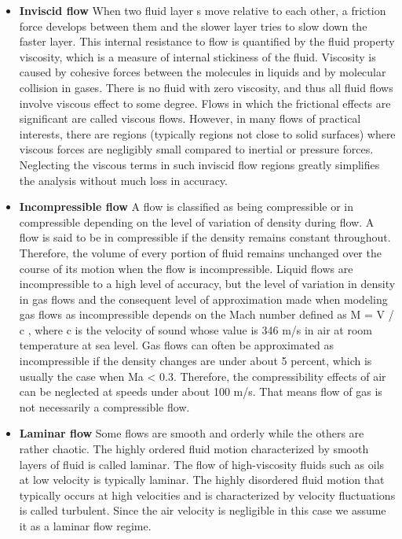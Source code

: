 \begin{itemize}
	\item  \textbf{Inviscid flow}
	When two fluid layer s move relative to each other, a friction force develops between them and the slower layer tries to slow down the faster layer. This internal resistance to flow is quantified by the fluid property viscosity, which is a measure of internal stickiness of the fluid. Viscosity is caused by cohesive forces between the molecules in liquids and by molecular collision in gases. There is no fluid with zero viscosity, and thus all fluid flows involve viscous effect to some degree. Flows in which the frictional effects are significant are called viscous flows. However, in many flows of practical interests, there are regions (typically regions not close to solid surfaces) where viscous forces are negligibly small compared to inertial or pressure forces. Neglecting the viscous terms in such inviscid flow regions greatly simplifies the analysis without much loss in accuracy.   
	
	\item \textbf{Incompressible flow}
	A flow is classified as being compressible or in compressible depending on the level of variation of density during flow. A flow is said to be in compressible if the density remains constant throughout. Therefore, the volume of every portion of fluid remains unchanged over the course of its motion when the flow is incompressible.
	Liquid flows are incompressible to a high level of accuracy, but the level of variation in density in gas flows and the consequent level of approximation made when modeling gas flows as incompressible depends on the Mach number defined as M = V / c , where c is the velocity of sound whose value is 346 m/s in air at room temperature at sea level. Gas flows can often be approximated as incompressible if the density changes are under about 5 percent, which is usually the case when Ma < 0.3. Therefore, the compressibility effects of air can be neglected at speeds under about 100 m/s. That means flow of gas is not necessarily a compressible flow.
	
	\item \textbf{ Laminar flow}
	Some flows are smooth and orderly while the others are rather chaotic. The highly ordered fluid motion characterized by smooth layers of fluid is called laminar. The flow of high-viscosity fluids such as oils at low velocity is typically laminar. The highly disordered fluid motion that typically occurs at high velocities and is characterized by velocity fluctuations is called turbulent. Since the air velocity is negligible in this case we assume it as a laminar flow regime.
	

\end{itemize}
